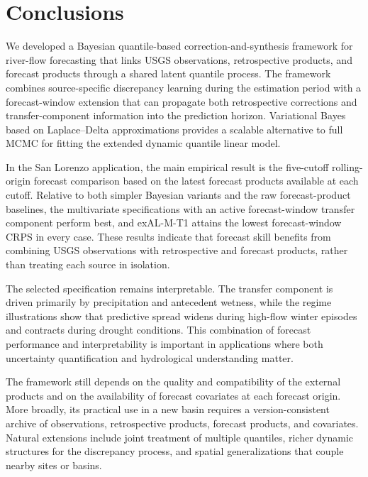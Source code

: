 \documentclass[APA,STIX1COL]{WileyNJD-v2}
\begin{document}
\section{Conclusions}
\label{sec5}

We developed a Bayesian quantile-based correction-and-synthesis framework for river-flow forecasting that links USGS observations, retrospective products, and forecast products through a shared latent quantile process. The framework combines source-specific discrepancy learning during the estimation period with a forecast-window extension that can propagate both retrospective corrections and transfer-component information into the prediction horizon. Variational Bayes based on Laplace--Delta approximations provides a scalable alternative to full MCMC for fitting the extended dynamic quantile linear model.

In the San Lorenzo application, the main empirical result is the five-cutoff rolling-origin forecast comparison based on the latest forecast products available at each cutoff. Relative to both simpler Bayesian variants and the raw forecast-product baselines, the multivariate specifications with an active forecast-window transfer component perform best, and exAL-M-T1 attains the lowest forecast-window CRPS in every case. These results indicate that forecast skill benefits from combining USGS observations with retrospective and forecast products, rather than treating each source in isolation.

The selected specification remains interpretable. The transfer component is driven primarily by precipitation and antecedent wetness, while the regime illustrations show that predictive spread widens during high-flow winter episodes and contracts during drought conditions. This combination of forecast performance and interpretability is important in applications where both uncertainty quantification and hydrological understanding matter.

The framework still depends on the quality and compatibility of the external products and on the availability of forecast covariates at each forecast origin. More broadly, its practical use in a new basin requires a version-consistent archive of observations, retrospective products, forecast products, and covariates. Natural extensions include joint treatment of multiple quantiles, richer dynamic structures for the discrepancy process, and spatial generalizations that couple nearby sites or basins.
\end{document}
